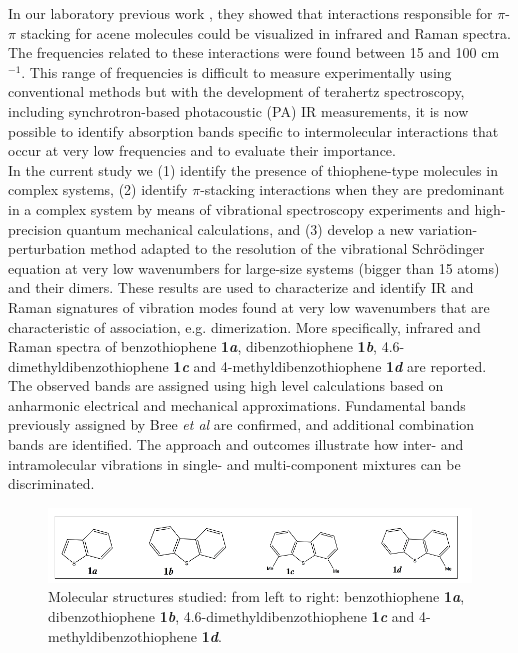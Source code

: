 	In our laboratory previous work \cite{spillebout2014discerning}, they showed that interactions responsible for $\pi$-$\pi$ stacking for acene molecules could be visualized in infrared and Raman spectra. The frequencies related to these interactions were found between 15 and 100 cm$^{-1}$. This range of frequencies is difficult to measure experimentally using conventional methods but with the development of terahertz spectroscopy, including synchrotron-based photacoustic (PA) IR measurements, it is now possible to identify absorption bands specific to intermolecular interactions that occur at very low frequencies and to evaluate their importance.\\
	
	In the current study we (1) identify the presence of thiophene-type molecules in complex systems, (2) identify $\pi$-stacking interactions when they are predominant in a complex system by means of vibrational spectroscopy experiments and high-precision quantum mechanical calculations, and (3) develop a new variation-perturbation method adapted to the resolution of the vibrational Schrödinger equation at very low wavenumbers for large-size systems (bigger than 15 atoms) and their dimers. These results are used to characterize and identify IR and Raman signatures of vibration modes found at very low wavenumbers that are characteristic of association, e.g. dimerization. More specifically, infrared and Raman spectra of benzothiophene \textbf{1\textit{a}}, dibenzothiophene \textbf{1\textit{b}}, 4.6-dimethyldibenzothiophene \textbf{1\textit{c}} and 4-methyldibenzothiophene \textbf{1\textit{d}} are reported. The observed bands are assigned using high level calculations based on anharmonic electrical and mechanical approximations. Fundamental bands previously assigned by Bree \textit{et al} \cite{bree1971vibrations} are confirmed, and additional combination bands are identified. The approach and outcomes illustrate how inter- and intramolecular vibrations in single- and multi-component mixtures can be discriminated.
	
	\begin{figure}[H]
		\centering
		\includegraphics[scale=0.7]{image/image/P1-F1}
		\caption{Molecular structures studied:  from left to right: benzothiophene \textbf{1\textit{a}}, dibenzothiophene \textbf{1\textit{b}}, 4.6-dimethyldibenzothiophene \textbf{1\textit{c}} and 4-methyldibenzothiophene \textbf{1\textit{d}}.}
	\end{figure}
	
